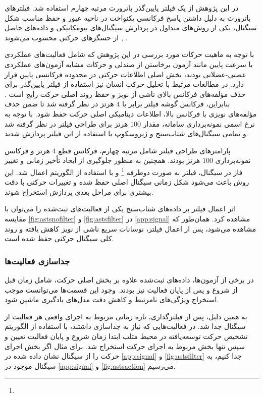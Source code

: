 در این پژوهش از یک فیلتر پایین‌گذر باترورث مرتبه چهارم استفاده شد. فیلترهای باترورث به دلیل داشتن پاسخ فرکانسی یکنواخت در ناحیه عبور و حفظ مناسب شکل سیگنال، یکی از روش‌های متداول در پردازش سیگنال‌های بیومکانیکی و داده‌های حاصل از حسگرهای حرکتی محسوب می‌شوند 
\cite{Winter2009Biomechanics},
\cite{Nasrabadi2019Thesis}. 

با توجه به ماهیت حرکات مورد بررسی در این پژوهش که شامل فعالیت‌های عملکردی با سرعت پایین مانند آزمون برخاستن از صندلی و حرکات مشابه آزمون‌های عملکردی عصبی-عضلانی بودند، بخش اصلی اطلاعات حرکتی در محدوده فرکانسی پایین قرار دارد. در مطالعات مرتبط با تحلیل حرکت انسان نیز استفاده از فیلتر پایین‌گذر برای حذف مؤلفه‌های فرکانس بالای ناشی از نویز و حفظ روند اصلی حرکت رایج است
 \cite{Winter2009Biomechanics}.
  بنابراین، فرکانس گوشه فیلتر برابر با $4$ هرتز در نظر گرفته شد تا ضمن حذف مؤلفه‌های نویزی با فرکانس بالا، اطلاعات دینامیکی اصلی حرکت حفظ شود. با توجه به نرخ اسمی نمونه‌برداری سامانه، مقدار $100$ هرتز برای طراحی فیلتر در نظر گرفته شد و تمامی سیگنال‌های شتاب‌سنج و ژیروسکوپ با استفاده از این فیلتر پردازش شدند.

پارامترهای طراحی فیلتر شامل مرتبه چهارم، فرکانس قطع $4$ هرتز و فرکانس نمونه‌برداری $100$ هرتز بودند. همچنین به منظور جلوگیری از ایجاد تأخیر زمانی و تغییر فاز در سیگنال، فیلتر به صورت دوطرفه 
\footnote{}
 و با استفاده از الگوریتم
  اعمال شد. این روش باعث می‌شود شکل زمانی سیگنال اصلی حفظ شده و تغییرات حرکتی با دقت بیشتری برای مراحل بعدی پردازش استخراج شوند.

اثر اعمال فیلتر بر داده‌های شتاب‌سنج یکی از فعالیت‌های ثبت‌شده را می‌توان با مقایسه 
\autoref{fig:astsnofilter}
و
\autoref{fig:astsfilter}
در 
\autoref{app:signal}
مشاهده کرد. همان‌طور که مشاهده می‌شود، پس از اعمال فیلتر، نوسانات سریع ناشی از نویز کاهش یافته و روند کلی سیگنال حرکتی حفظ شده است.

\subsubsection{جداسازی فعالیت‌ها}

در برخی از آزمون‌ها، داده‌های ثبت‌شده علاوه بر بخش اصلی حرکت، شامل زمان قبل از شروع و پس از پایان فعالیت نیز بودند. وجود این قسمت‌ها می‌توانست موجب استخراج ویژگی‌های نامرتبط و کاهش دقت مدل‌های یادگیری ماشین شود.

به همین دلیل، پس از فیلترگذاری، بازه زمانی مربوط به اجرای واقعی هر فعالیت از سیگنال جدا شد. در فعالیت‌هایی که نیاز به جداسازی داشتند، با استفاده از الگوریتم تشخیص حرکت توسعه‌یافته در محیط متلب  ابتدا زمان شروع و پایان فعالیت تعیین و سپس تنها بخش مربوط به اجرای حرکت استخراج شد. برای مثال اگر بخش اجرای حرکت را از سیگنال نشان داده شده در
\autoref{app:signal}
و
\autoref{fig:astsfilter}
جدا کنیم، به سیگنال موجود در 
\autoref{app:signal}
و
\autoref{fig:astsaction}
می‌رسیم.

